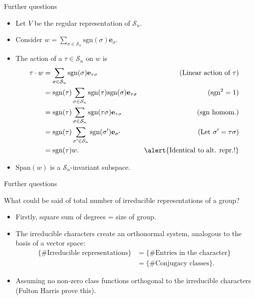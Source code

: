 \documentclass[10pt]{beamer}
\newcommand{\Sym}{\mathcal{S}}
\newcommand{\sgn}{\text{sgn}}
\newcommand{\bas}{\mathbf{e}}
\newcommand{\Span}{\text{Span}}
\begin{document}
\begin{frame}{Further questions}
	\begin{example}
		\begin{itemize}
			\item Let $V$ be the regular representation of $\Sym_n$.
			
			\item Consider $w = \sum_{\sigma \in \Sym_n} \sgn(\sigma)\bas_\sigma$.
			
			\item The action of a $\tau \in \Sym_n$ on $w$ is \begin{align*}
				\tau \cdot w &= \sum_{\sigma \in \Sym_n} \sgn(\sigma)\bas_{\tau\sigma} & \text{(Linear action of $\tau$)} \\ 
				&= \sgn(\tau)\sum_{\sigma \in \Sym_n} \sgn(\tau)\sgn(\sigma)\bas_{\tau\sigma} & \text{($\sgn^2 = 1$)}\\
				&= \sgn(\tau)\sum_{\sigma \in \Sym_n} \sgn(\tau\sigma)\bas_{\tau\sigma} & \text{(sgn homom.)} \\
				&= \sgn(\tau)\sum_{\sigma' \in \Sym_n} \sgn(\sigma')\bas_{\sigma'} & \text{(Let $\sigma' = \tau\sigma$)} \\
				&= \sgn(\tau) w. & \text{\alert{Identical to alt. repr.!}}
			\end{align*}	
			
			
			\item $\Span(w)$ is a $\Sym_n$-invariant subspace.
		\end{itemize}
		\end{example}
\end{frame}

\begin{frame}{Further questions}
	\begin{block}{What could be said of total number of irreducible representations of a group?}
		\begin{itemize}
			\item Firstly, square sum of degrees = size of group.
			
			\item The irreducible characters create an orthonormal system, analogous to the basis of a vector space:
			\begin{align*}
									\{\text{\# Irreducible representations}\} &= \{\text{\# Entries in the character}\} \\
									&= \{\text{\# Conjugacy classes}\}.
			\end{align*}
			
			\item Assuming no non-zero class functions orthogonal to the irreducible characters (Fulton Harris prove this).
		\end{itemize}
	\end{block}
\end{frame}
\end{document}
